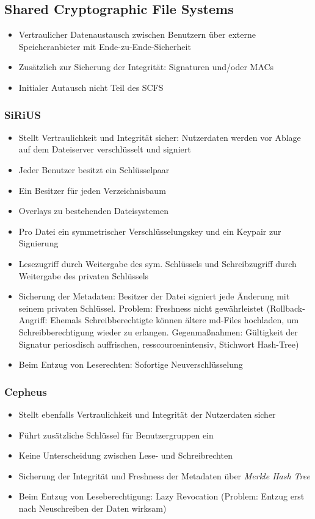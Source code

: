 \subsection{Shared Cryptographic File Systems}
\begin{itemize}
	\item Vertraulicher Datenaustausch zwischen Benutzern über externe Speicheranbieter mit Ende-zu-Ende-Sicherheit
	\item Zusätzlich zur Sicherung der Integrität: Signaturen und/oder MACs
	\item Initialer Autausch nicht Teil des SCFS
\end{itemize}

\subsubsection{SiRiUS}
\begin{itemize}
	\item Stellt Vertraulichkeit und Integrität sicher: Nutzerdaten werden vor Ablage auf dem Dateiserver verschlüsselt und signiert
	\item Jeder Benutzer besitzt ein Schlüsselpaar
	\item Ein Besitzer für jeden Verzeichnisbaum
	\item Overlays zu bestehenden Dateisystemen
	\item Pro Datei ein symmetrischer Verschlüsselungskey und ein Keypair zur Signierung
	\item Lesezugriff durch Weitergabe des sym. Schlüssels und Schreibzugriff durch Weitergabe des privaten Schlüssels
	\item Sicherung der Metadaten: Besitzer der Datei signiert jede Änderung mit seinem privaten Schlüssel. Problem: Freshness nicht gewährleistet (Rollback-Angriff: Ehemals Schreibberechtigte können ältere md-Files hochladen, um Schreibberechtigung wieder zu erlangen. Gegenmaßnahmen: Gültigkeit der Signatur periosdisch auffrischen, resscourcenintensiv, Stichwort Hash-Tree)
	\item Beim Entzug von Leserechten: Sofortige Neuverschlüsselung
\end{itemize}

\subsubsection{Cepheus}
\begin{itemize}
	\item Stellt ebenfalls Vertraulichkeit und Integrität der Nutzerdaten sicher
	\item Führt zusätzliche Schlüssel für Benutzergruppen ein
	\item Keine Unterscheidung zwischen Lese- und Schreibrechten
	\item Sicherung der Integrität und Freshness der Metadaten über \textit{Merkle Hash Tree}
	\item Beim Entzug von Leseberechtigung: Lazy Revocation (Problem: Entzug erst nach Neuschreiben der Daten wirksam)
\end{itemize}

